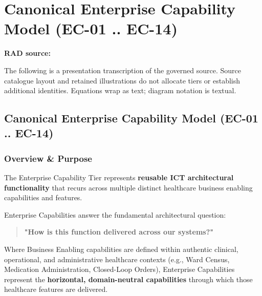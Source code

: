 \chapter{Canonical Enterprise Capability Model (EC-01 .. EC-14)}\label{rad:enterprise}
\noindent\textbf{RAD source:} \texttt{}

The following is a presentation transcription of the governed source. Source catalogue layout and retained illustrations do not allocate tiers or establish additional identities. Equations wrap as text; diagram notation is textual.

\label{rad:enterprise:1}
\section*{Canonical Enterprise Capability Model (EC-01 .. EC-14)}
\label{rad:enterprise:3}
\subsection*{Overview \& Purpose}
\label{rad:enterprise:5}

The Enterprise Capability Tier represents \textbf{reusable ICT architectural functionality} that recurs across multiple distinct healthcare business enabling capabilities and features.

\label{rad:enterprise:7}

Enterprise Capabilities answer the fundamental architectural question:

\label{rad:enterprise:8}

\begin{quote}

\textbf{"How is this function delivered across our systems?"}


\end{quote}
\label{rad:enterprise:10}

Where Business Enabling capabilities are defined within authentic clinical, operational, and administrative healthcare contexts (e.g., Ward Census, Medication Administration, Closed-Loop Orders), Enterprise Capabilities represent the \textbf{horizontal, domain-neutral capabilities} through which those healthcare features are delivered.

